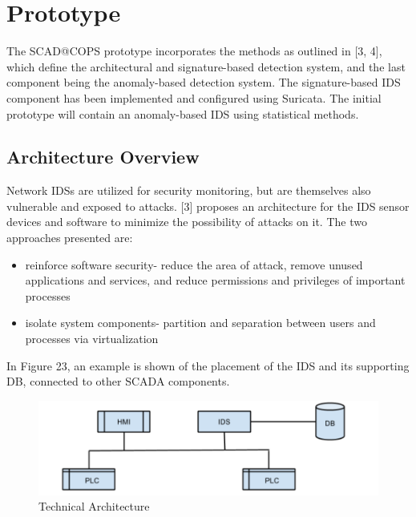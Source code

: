 \documentclass[12pt,]{article}
\begin{document}
\pagebreak

\section{Prototype}\label{prototype}

The SCAD@COPS prototype incorporates the methods as outlined in {[}3,
4{]}, which define the architectural and signature-based detection
system, and the last component being the anomaly-based detection system.
The signature-based IDS component has been implemented and configured
using Suricata. The initial prototype will contain an anomaly-based IDS
using statistical methods.

\subsection{Architecture Overview}\label{architecture-overview}

Network IDSs are utilized for security monitoring, but are themselves
also vulnerable and exposed to attacks. {[}3{]} proposes an architecture
for the IDS sensor devices and software to minimize the possibility of
attacks on it. The two approaches presented are:

\begin{itemize}
\itemsep1pt\parskip0pt
\item
  reinforce software security- reduce the area of attack, remove unused
  applications and services, and reduce permissions and privileges of
  important processes
\item
  isolate system components- partition and separation between users and
  processes via virtualization
\end{itemize}

In Figure 23, an example is shown of the placement of the IDS and its
supporting DB, connected to other SCADA components.

\begin{figure}

{\centering \includegraphics{thesis_files/figure-latex/unnamed-chunk-34-1} 

}

\caption{Technical Architecture}\label{fig:unnamed-chunk-34}
\end{figure}
\end{document}
